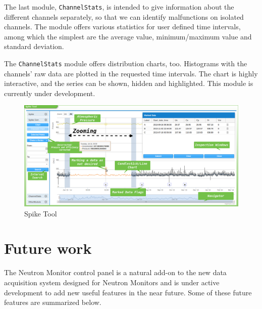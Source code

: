 \documentclass[a4paper]{jpconf}
\begin{document}
The last module, \texttt{ChannelStats}, is intended to give information about the
different channels separately, so that we can identify malfunctions on isolated
channels. The module offers various statistics for user defined time intervals,
among which the simplest are the average value, minimum/maximum
value and standard deviation.

The \texttt{ChannelStats} module offers distribution charts, too. Histograms with the
channels' raw data are plotted in the requested time intervals. The chart is
highly interactive, and the series can be shown, hidden and highlighted. This module is currently under development.

\begin{figure}[h]
    \centering
    \includegraphics[keepaspectratio, width=1\textwidth]{./resources/SpikeTool.png}
    \caption{Spike Tool}
    \label{fig:SpikeTool}
\end{figure}

\section{Future work}

The Neutron Monitor control panel is a natural add-on to the new data
acquisition system designed for Neutron Monitors and is under active
development to add new useful features in the near future. Some of these future
features are summarized below.
\end{document}
